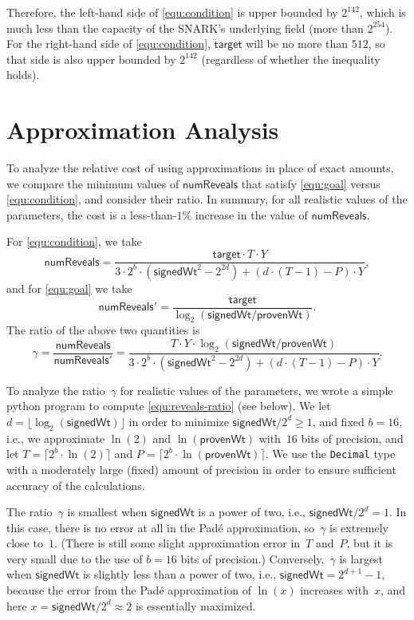 \documentclass[11pt,hidelinks]{article}
\newcommand{\numreveals}{\mathsf{numReveals}}
\newcommand{\sigwt}{\mathsf{signedWt}}
\newcommand{\provwt}{\mathsf{provenWt}}
\newcommand{\target}{\mathsf{target}}
\begin{document}
Therefore, the left-hand side of \cref{equ:condition} is upper bounded by $2^{142}$, which is much less than the capacity of the SNARK's underlying field (more than $2^{254}$).
For the right-hand side of \cref{equ:condition}, $\target$ will be no more than $512$, so that side is also upper bounded by $2^{142}$ (regardless of whether the inequality holds).

\section{Approximation Analysis}
\label{sec:analysis}

To analyze the relative cost of using approximations in place of exact amounts, we compare the minimum values of $\numreveals$ that satisfy \cref{equ:goal} versus \cref{equ:condition}, and consider their ratio.
In summary, for all realistic values of the parameters, the cost is a less-than-$1\%$ increase in the value of $\numreveals$.

For \cref{equ:condition}, we take
\[ \numreveals = \frac{\target \cdot T \cdot Y}{3\cdot 2^b \cdot (\sigwt^2 - 2^{2d}) + (d \cdot (T - 1) - P) \cdot Y}, \]
and for \cref{equ:goal} we take
\[ \numreveals' = \frac{\target}{\log_2(\sigwt/\provwt)}. \]
The ratio of the above two quantities is
\begin{equation}
\label{equ:reveals-ratio}
\gamma = \frac{\numreveals}{\numreveals'} 
= \frac{T \cdot Y \cdot \log_2(\sigwt/\provwt)}{3\cdot 2^b \cdot (\sigwt^2 - 2^{2d}) + (d \cdot (T - 1) - P) \cdot Y} .
\end{equation}

To analyze the ratio~$\gamma$ for realistic values of the parameters, we wrote a simple python program to compute \cref{equ:reveals-ratio} (see below).
We let~$d = \lfloor \log_2(\sigwt) \rfloor$ in order to minimize $\sigwt/2^d \geq 1$, and fixed $b=16$, i.e., we approximate $\ln(2)$ and $\ln(\provwt)$ with~$16$ bits of precision, and let $T = \lceil 2^b \cdot \ln(2) \rceil$ and $P = \lceil 2^b \cdot \ln(\provwt) \rceil$.
We use the \texttt{Decimal} type with a moderately large (fixed) amount of precision in order to ensure sufficient accuracy of the calculations.

The ratio~$\gamma$ is smallest when $\sigwt$ is a power of two, i.e., $\sigwt/2^d = 1$.
In this case, there is no error at all in the Pad{\'e} approximation, so~$\gamma$ is extremely close to~$1$.
(There is still some slight approximation error in~$T$ and~$P$, but it is very small due to the use of $b=16$ bits of precision.)
Conversely,~$\gamma$ is largest when $\sigwt$ is slightly less than a power of two, i.e., $\sigwt = 2^{d+1} - 1$, because the error from the Pad{\'e} approximation of $\ln(x)$ increases with~$x$, and here $x=\sigwt/2^d \approx 2$ is essentially maximized.
\end{document}
